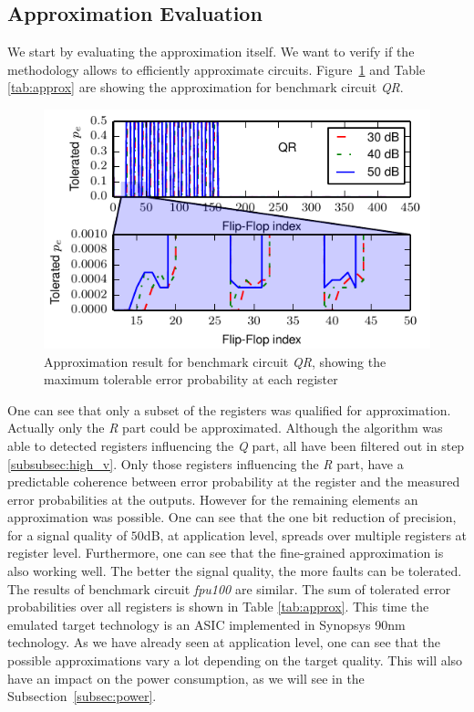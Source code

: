\documentclass[conference]{IEEEtran}
\begin{document}
\subsection{Approximation Evaluation}
We start by evaluating the approximation itself. We want to verify if the methodology allows to efficiently approximate circuits.
Figure~\ref{fig:optimization_qr} and Table \ref{tab:approx} are showing the approximation for benchmark circuit \emph{QR}. 
\begin{figure}[htb]
  \centering
  \includegraphics[width=.48\textwidth]{figs/optimization_qr}
  \caption{Approximation result for benchmark circuit \emph{QR}, showing the maximum tolerable error probability at each register}
  \label{fig:optimization_qr}
\end{figure}
One can see that only a subset of the registers was qualified for approximation. Actually only the \emph{R} part could be approximated. Although the algorithm was able to detected registers influencing the \emph{Q} part, all have been filtered out in step \ref{subsubsec:high_v}. Only those registers influencing the \emph{R} part, have a predictable coherence between error probability at the register and the measured error probabilities at the outputs. However for the remaining elements an approximation was possible. One can see that the one bit reduction of precision, for a signal quality of $50$dB, at application level, spreads over multiple registers at register level. Furthermore, one can see that the fine-grained approximation is also working well. The better the signal quality, the more faults can be tolerated.
The results of benchmark circuit \emph{fpu100} are similar. The sum of tolerated error probabilities over all registers is shown in Table \ref{tab:approx}. This time the emulated target technology is an ASIC implemented in Synopsys 90nm technology. As we have already seen at application level, one can see that the possible approximations vary a lot depending on the target quality. This will also have an impact on the power consumption, as we will see in the Subsection~\ref{subsec:power}.
\end{document}
